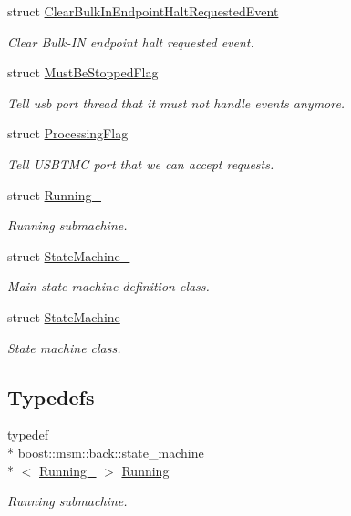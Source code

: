 \begin{DoxyCompactItemize}
struct \hyperlink{structmdt_usbtmc_transfer_handler_state_machine_1_1_clear_bulk_in_endpoint_halt_requested_event}{Clear\-Bulk\-In\-Endpoint\-Halt\-Requested\-Event}
\begin{DoxyCompactList}\small\item\em Clear Bulk-\/\-I\-N endpoint halt requested event. \end{DoxyCompactList}\item 
struct \hyperlink{structmdt_usbtmc_transfer_handler_state_machine_1_1_must_be_stopped_flag}{Must\-Be\-Stopped\-Flag}
\begin{DoxyCompactList}\small\item\em Tell usb port thread that it must not handle events anymore. \end{DoxyCompactList}\item 
struct \hyperlink{structmdt_usbtmc_transfer_handler_state_machine_1_1_processing_flag}{Processing\-Flag}
\begin{DoxyCompactList}\small\item\em Tell U\-S\-B\-T\-M\-C port that we can accept requests. \end{DoxyCompactList}\item 
struct \hyperlink{structmdt_usbtmc_transfer_handler_state_machine_1_1_running__}{Running\-\_\-}
\begin{DoxyCompactList}\small\item\em Running submachine. \end{DoxyCompactList}\item 
struct \hyperlink{structmdt_usbtmc_transfer_handler_state_machine_1_1_state_machine__}{State\-Machine\-\_\-}
\begin{DoxyCompactList}\small\item\em Main state machine definition class. \end{DoxyCompactList}\item 
struct \hyperlink{structmdt_usbtmc_transfer_handler_state_machine_1_1_state_machine}{State\-Machine}
\begin{DoxyCompactList}\small\item\em State machine class. \end{DoxyCompactList}\end{DoxyCompactItemize}
\subsection*{Typedefs}
\begin{DoxyCompactItemize}
\item 
typedef \\*
boost\-::msm\-::back\-::state\-\_\-machine\\*
$<$ \hyperlink{structmdt_usbtmc_transfer_handler_state_machine_1_1_running__}{Running\-\_\-} $>$ \hyperlink{namespacemdt_usbtmc_transfer_handler_state_machine_abc32bfe633094c8a0764568f294ef3e5}{Running}
\begin{DoxyCompactList}\small\item\em Running submachine. \end{DoxyCompactList}\end{DoxyCompactItemize}



